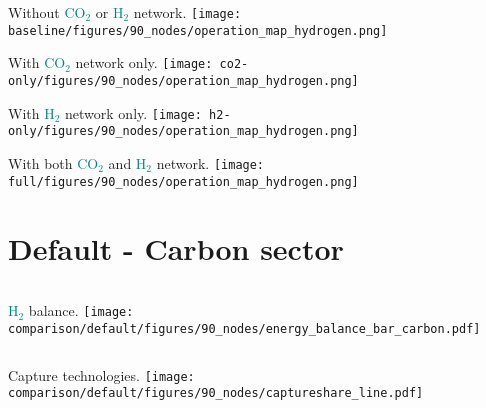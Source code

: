 \documentclass[12pt, aspectratio=169]{beamer}
\newcommand{\carbon}{\textcolor{teal}{CO$_2$}}
\newcommand{\hydrogen}{\textcolor{teal}{H$_2$}}
\begin{document}
\begin{frame}
    \begin{center}
    Without \carbon{} or \hydrogen{} network.
    \texttt{[image: baseline/figures/90\_nodes/operation\_map\_hydrogen.png]}
    \end{center}
\end{frame}


\begin{frame}
    \begin{center}
    With \carbon{} network only.
    \texttt{[image: co2-only/figures/90\_nodes/operation\_map\_hydrogen.png]}
    \end{center}
\end{frame}

\begin{frame}
    \begin{center}
    With \hydrogen{} network only.
    \texttt{[image: h2-only/figures/90\_nodes/operation\_map\_hydrogen.png]}
    \end{center}
\end{frame}


\begin{frame}
    \begin{center}
    With both \carbon{}  and \hydrogen{} network.
    \texttt{[image: full/figures/90\_nodes/operation\_map\_hydrogen.png]}
    \end{center}
\end{frame}






\section*{Default - Carbon sector}

\begin{frame}
    \begin{columns}
        \hydrogen{} balance.
        \texttt{[image: comparison/default/figures/90\_nodes/energy\_balance\_bar\_carbon.pdf]}
    \end{columns}
\end{frame}

\begin{frame}
    \begin{columns}
        Capture technologies.
        \texttt{[image: comparison/default/figures/90\_nodes/captureshare\_line.pdf]}
    \end{columns}
\end{frame}
\end{document}
